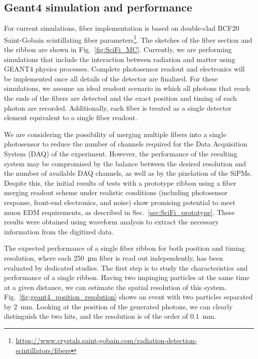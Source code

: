 \begin{refsection}
    \subsection{Geant4 simulation and performance}
        For current simulations, fiber implementation is based on double-clad BCF20 Saint-Gobain scintillating fiber parameters\footnote{\url{https://www.crystals.saint-gobain.com/radiation-detection-scintillators/fibers}}.
        The sketches of the fiber section and the ribbon are shown in Fig.~\ref{fig:SciFi_MC}.
        Currently, we are performing simulations that include the interaction between radiation and matter using \textsc{GEANT4} physics processes. Complete photosensor readout and electronics will be implemented once all details of the detector are finalized. 
        For these simulations, we assume an ideal readout scenario in which all photons that reach the ends of the fibers are detected and the exact position and timing of each photon are recorded. Additionally, each fiber is treated as a single detector element equivalent to a single fiber readout.

        We are considering the possibility of merging multiple fibers into a single photosensor to reduce the number of channels required for the Data Acquisition System (DAQ) of the experiment. 
        However, the performance of the resulting system may be compromised by the balance between the desired resolution and the number of available DAQ channels, as well as by the pixelation of the SiPMs. Despite this, the initial results of tests with a prototype ribbon using a fiber merging readout scheme under realistic conditions (including photosensor response, front-end electronics, and noise) show promising potential to meet muon EDM requirements, as described in Sec.~\ref{sec:SciFi_prototype}. These results were obtained using waveform analysis to extract the necessary information from the digitized data.

        The expected performance of a single fiber ribbon for both position and timing resolution, where each \SI{250}{\micro m} fiber is read out independently, has been evaluated by dedicated studies. 
        The first step is to study the characteristics and performance of a single ribbon. Having two impinging particles at the same time at a given distance, we can estimate the spatial resolution of this system.  Fig.~\ref{fig:geant4_position_resolution} shows an event with two particles separated by \SI{2}{mm}. Looking at the position of the generated photons, we can clearly distinguish the two hits, and the resolution is of the order of \SI{0.1}{mm}.


\end{refsection}
